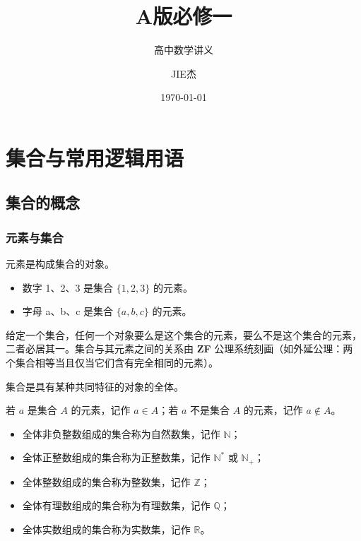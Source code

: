 \documentclass[lang=cn,newtx,10pt,scheme=chinese,nofont]{elegantbook}
\title{A版必修一}
\subtitle{高中数学讲义}
\author{JIE杰}
\institute{JIE杰}
\date{\today}
\begin{document}
\maketitle

\frontmatter
\tableofcontents

\mainmatter

\chapter{集合与常用逻辑用语}

\section{集合的概念}
\subsection{元素与集合}
\begin{definition}[元素]
元素是构成集合的对象。
\begin{example}
    \begin{itemize}
        \item 数字 1、2、3 是集合 $\{1,2,3\}$ 的元素。
        \item 字母 a、b、c 是集合 $\{a,b,c\}$ 的元素。 
    \end{itemize}
\end{example}
\end{definition}
\begin{axiom}[集合的确定性]
给定一个集合，任何一个对象要么是这个集合的元素，要么不是这个集合的元素，二者必居其一。集合与其元素之间的关系由 \textbf{ZF} 公理系统刻画（如外延公理：两个集合相等当且仅当它们含有完全相同的元素）。
\end{axiom}
\begin{definition}[集合]
集合是具有某种共同特征的对象的全体。
\end{definition}





\begin{definition}[元素与集合的关系]
若 $a$ 是集合 $A$ 的元素，记作 $a \in A$；若 $a$ 不是集合 $A$ 的元素，记作 $a \notin A$。
\end{definition}
\begin{definition}[常用数集]
\begin{itemize}
    \item 全体非负整数组成的集合称为自然数集，记作 $\mathbb{N}$；
    \item 全体正整数组成的集合称为正整数集，记作 $\mathbb{N}^*$ 或 $\mathbb{N}_+$；
    \item 全体整数组成的集合称为整数集，记作 $\mathbb{Z}$；
    \item 全体有理数组成的集合称为有理数集，记作 $\mathbb{Q}$；
    \item 全体实数组成的集合称为实数集，记作 $\mathbb{R}$。
\end{itemize}
\end{definition}
\end{document}
